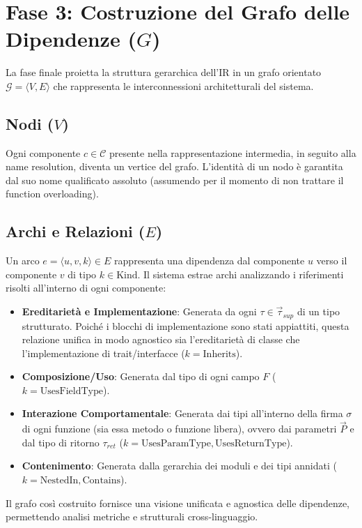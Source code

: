 \section{Fase 3: Costruzione del Grafo delle Dipendenze ($G$)}
La fase finale proietta la struttura gerarchica dell'IR in un grafo
orientato $\mathcal{G} = \langle V, E \rangle$ che rappresenta le
interconnessioni architetturali del sistema.

\subsection{Nodi ($V$)}
Ogni componente $c \in \mathcal{C}$ presente nella rappresentazione
intermedia, in seguito alla name resolution, diventa un vertice del
grafo. L'identità di un nodo è garantita dal suo nome qualificato
assoluto (assumendo per il momento di non trattare il function overloading).

\subsection{Archi e Relazioni ($E$)}
Un arco $e = \langle u, v, k \rangle \in E$ rappresenta una
dipendenza dal componente $u$ verso il componente $v$ di tipo $k \in
\text{Kind}$. Il sistema estrae archi analizzando i riferimenti
risolti all'interno di ogni componente:
\begin{itemize}
  \item \textbf{Ereditarietà e Implementazione}: Generata da ogni
    $\tau \in \vec{\tau}_{sup}$ di un tipo strutturato. Poiché i
    blocchi di implementazione sono stati appiattiti, questa
    relazione unifica in modo agnostico sia l'ereditarietà di classe
    che l'implementazione di trait/interfacce ($k = \text{Inherits}$).
  \item \textbf{Composizione/Uso}: Generata dal tipo di ogni campo
    $F$ ($k = \text{UsesFieldType}$).
  \item \textbf{Interazione Comportamentale}: Generata dai tipi
    all'interno della firma $\sigma$ di ogni funzione (sia essa
    metodo o funzione libera), ovvero dai parametri $\vec{P}$ e dal
    tipo di ritorno $\tau_{ret}$ ($k = \text{UsesParamType},
    \text{UsesReturnType}$).
  \item \textbf{Contenimento}: Generata dalla gerarchia dei moduli e
    dei tipi annidati ($k = \text{NestedIn}, \text{Contains}$).
\end{itemize}
Il grafo così costruito fornisce una visione unificata e agnostica
delle dipendenze, permettendo analisi metriche e strutturali cross-linguaggio.

